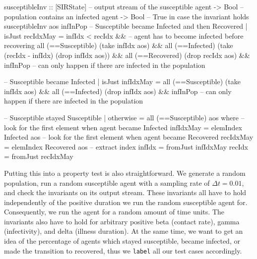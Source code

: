 \begin{HaskellCode}
susceptibleInv :: [SIRState] -- output stream of the susceptible agent 
               -> Bool       -- population contains an infected agent
               -> Bool       -- True in case the invariant holds
susceptibleInv aos infInPop
    -- Susceptible became Infected and then Recovered
    | isJust recIdxMay 
      = infIdx < recIdx &&  -- agent has to become infected before recovering
        all (==Susceptible) (take infIdx aos) && 
        all (==Infected) (take (recIdx - infIdx) (drop infIdx aos)) && 
        all (==Recovered) (drop recIdx aos) &&
        infInPop  -- can only happen if there are infected in the population

    -- Susceptible became Infected
    | isJust infIdxMay 
      = all (==Susceptible) (take infIdx aos) &&
        all (==Infected) (drop infIdx aos) &&
        infInPop -- can only happen if there are infected in the population

    -- Susceptible stayed Susceptible
    | otherwise = all (==Susceptible) aos
  where
    -- look for the first element when agent became Infected
    infIdxMay = elemIndex Infected aos
    -- look for the first element when agent became Recovered
    recIdxMay = elemIndex Recovered aos
    -- extract index
    infIdx = fromJust infIdxMay
    recIdx = fromJust recIdxMay
\end{HaskellCode}

Putting this into a property test is also straightforward. We generate a random population, run a random susceptible agent with a sampling rate of $\Delta t = 0.01$, and check the invariants on its output stream. These invariants all have to hold independently of the positive duration we run the random susceptible agent for. Consequently, we run the agent for a random amount of time units. The invariants also have to hold for arbitrary positive beta (contact rate), gamma (infectivity), and delta (illness duration). At the same time, we want to get an idea of the percentage of agents which stayed susceptible, became infected, or made the transition to recovered, thus we \texttt{label} all our test cases accordingly.

